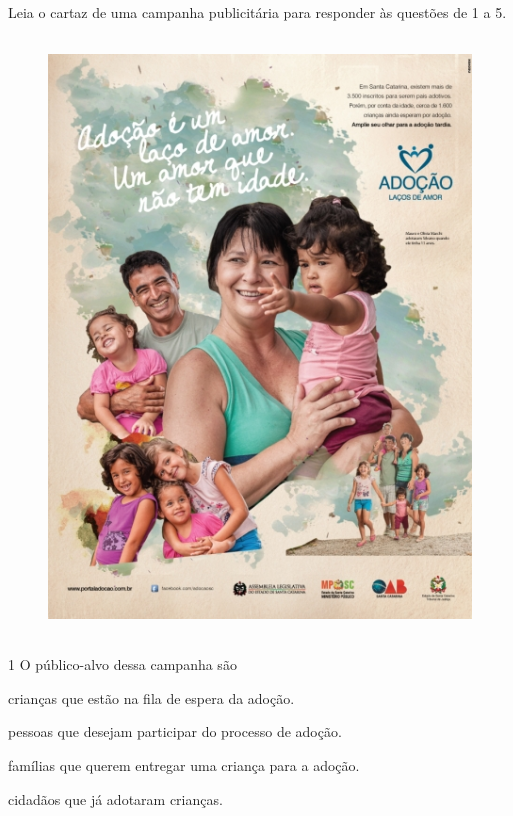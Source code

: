 
Leia o cartaz de uma campanha publicitária para responder às questões de
1 a 5.


\begin{figure}[htpb!]
\centering
\includegraphics[width=4.68750in,height=6.25000in]{./_SAEB_9_POR/media/image33.jpeg}
\end{figure}


\num{1} O público-alvo dessa campanha são

\begin{escolha}
\item
  crianças que estão na fila de espera da adoção.
\item
  pessoas que desejam participar do processo de adoção.
\item
  famílias que querem entregar uma criança para a adoção.
\item
  cidadãos que já adotaram crianças.
\end{escolha}

